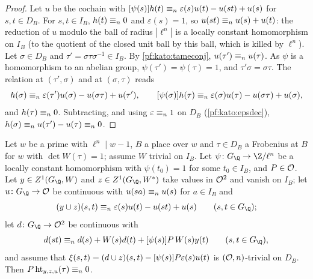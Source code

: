 \begin{proof}
Let $u$ be the cochain with $[\psi(s)]h(t)\equiv_{n}\varepsilon(s)u(t)-u(st)+u(s)$ for $s,t\in D_B$. For $s,t\in I_B$, $h(t)\equiv_{n}0$
and $\varepsilon(s)=1$, so $u(st)\equiv_{n}u(s)+u(t)$: the reduction of $u$ modulo the ball of radius $|\ell^n|$ is a locally
constant homomorphism on $I_B$ (to the quotient of the closed unit ball by this ball, which is killed by $\ell^n$). Let
$\sigma\in D_B$ and $\tau'=\sigma\tau\sigma^{-1}\in I_B$. By \cref{pf:kato:tameconj}, $u(\tau')\equiv_{n}u(\tau)$. As $\psi$ is a homomorphism
to an abelian group, $\psi(\tau')=\psi(\tau)=1$, and $\tau'\sigma=\sigma\tau$. The relation at $(\tau',\sigma)$ and at $(\sigma,\tau)$ reads
\[
  h(\sigma)\equiv_{n}\varepsilon(\tau')u(\sigma)-u(\sigma\tau)+u(\tau'),\qquad
  [\psi(\sigma)]h(\tau)\equiv_{n}\varepsilon(\sigma)u(\tau)-u(\sigma\tau)+u(\sigma),
\]
and $h(\tau)\equiv_{n}0$. Subtracting, and using $\varepsilon\equiv_{n}1$ on $D_B$ (\cref{pf:kato:epsdec}),
$h(\sigma)\equiv_{n}u(\tau')-u(\tau)\equiv_{n}0$.
\end{proof}

\begin{proposition}\label{pf:kato:locw}
Let $w$ be a prime with $\ell^n\mid w-1$, $B$ a place over $w$ and $\tau\in D_B$ a Frobenius at $B$ for $w$ with
$\det W(\tau)=1$; assume $W$ trivial on $I_B$. Let $\psi\colon G_\Q\to\Z/\ell^n$ be a locally constant homomorphism with
$\psi(t_0)=1$ for some $t_0\in I_B$, and $P\in\mathcal{O}$. Let $y\in\katoZ(G_\Q,W)$ and $z\in\katoZ(G_\Q,W^*)$ take values in
$\mathcal{O}^2$ and vanish on $I_B$; let $u\colon G_\Q\to\katoO$ be continuous with $u(sa)\equiv_{n}u(s)$ for $a\in I_B$ and
\begin{equation}\label{pf:kato:eq:du}
  (y\cup z)(s,t)\katoeq n\varepsilon(s)u(t)-u(st)+u(s)\qquad(s,t\in G_\Q);
\end{equation}
let $d\colon G_\Q\to\katoO^2$ be continuous with
\begin{equation}\label{pf:kato:eq:dertw}
  d(st)\katoeq nd(s)+W(s)d(t)+\katorep{\psi(s)}P\,W(s)y(t)\qquad(s,t\in G_\Q),
\end{equation}
and assume that $\xi(s,t)=(d\cup z)(s,t)-[\psi(s)]P\varepsilon(s)u(t)$ is $(\mathcal{O},n)$-trivial on $D_B$. Then
$P\,\mathrm{ht}_{y,z,u}(\tau)\equiv_{n}0$.
\end{proposition}

